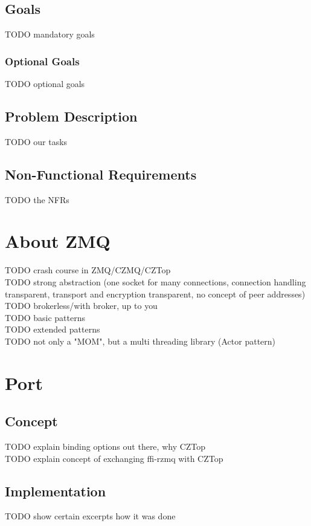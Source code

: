 \documentclass[a4paper]{report}
\begin{document}
\section{Goals}
TODO mandatory goals

\subsection*{Optional Goals}
TODO optional goals

\section{Problem Description}
TODO our tasks

\section{Non-Functional Requirements}
TODO the NFRs

\chapter{About ZMQ}

TODO crash course in ZMQ/CZMQ/CZTop\\
TODO strong abstraction (one socket for many connections, connection handling transparent, transport and encryption transparent, no concept of peer addresses)\\
TODO brokerless/with broker, up to you\\
TODO basic patterns\\
TODO extended patterns\\
TODO not only a "MOM", but a multi threading library (Actor pattern)\\

\chapter{Port}\label{ch:port}
\section{Concept}
TODO explain binding options out there, why CZTop\\
TODO explain concept of exchanging ffi-rzmq with CZTop\\

\section{Implementation}
TODO show certain excerpts how it was done
\end{document}
